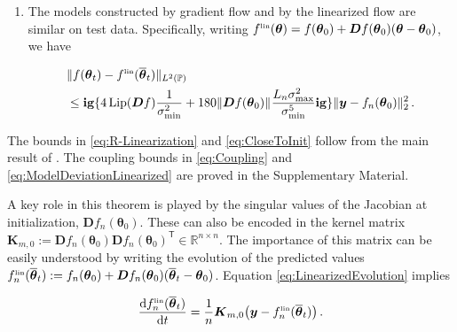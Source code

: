 \begin{theorem}
\begin{enumerate}
\item The models constructed by gradient flow and by the linearized flow are similar on test data. Specifically, writing $f^{\mbox{\rm\tiny lin}}({\boldsymbol \theta}) = f({\boldsymbol \theta}_0)+{\boldsymbol D} f({\boldsymbol \theta}_0) ({\boldsymbol \theta}-{\boldsymbol \theta}_0)$, we have  

  \begin{align}
      \lefteqn{\|f({\boldsymbol \theta}_t)
      -f^{\mbox{\rm\tiny lin}}(\overline{\boldsymbol \theta}_t)\|_{L^2(\mathbb{P})}}
      & \notag\\*
      & \le \mathbf{ig}\{4\, {\rm Lip}({\boldsymbol D} f)\frac{1}{\sigma_{\min}^2}+
    180\|{\boldsymbol D}
    f({\boldsymbol \theta}_0)\|_{}\frac{L_n\sigma_{\max}^2}{\sigma_{\min}^5}\mathbf{ig}\}\|{\boldsymbol y}-f_n({\boldsymbol \theta}_0)\|_2^2\, .  \label{eq:ModelDeviationLinearized}
  \end{align}
\end{enumerate}
\end{theorem}

The bounds in \eqref{eq:R-Linearization} and \eqref{eq:CloseToInit} follow from the main result of \cite{oymak2019overparameterized}. The coupling bounds in \eqref{eq:Coupling} and
\eqref{eq:ModelDeviationLinearized} are proved in the Supplementary Material.

A key role in this theorem is played by the singular values of the Jacobian at initialization, ${\boldsymbol D} f_n({\boldsymbol \theta}_0)$. These can also be encoded in the kernel matrix ${\boldsymbol K}_{m,0}:=
{\boldsymbol D} f_n({\boldsymbol \theta}_0) {\boldsymbol D} f_n({\boldsymbol \theta}_0)^{{\mathsf T}}\in{\mathbb R}^{n\times n}$. The importance of this matrix can be easily understood by writing the evolution of the predicted values $f^{\mbox{\rm\tiny lin}}_{n}(\overline{\boldsymbol \theta}_t):= f_n({\boldsymbol \theta}_0)+{\boldsymbol D}  f_n({\boldsymbol \theta}_0)(\overline{\boldsymbol \theta}_t-{\boldsymbol \theta}_0)$. Equation  \eqref{eq:LinearizedEvolution}
implies

\begin{align}

  \frac{{\rm d} f^{\mbox{\rm\tiny lin}}_{n}(\overline{\boldsymbol \theta}_t)}{{\rm d} t} = \frac{1}{n}{\boldsymbol K}_{m,0}\big({\boldsymbol y}-f^{\mbox{\rm\tiny lin}}_{n}(\overline{\boldsymbol \theta}_t)\big)\, .\label{eq:EvolutionPred}

\end{align}


